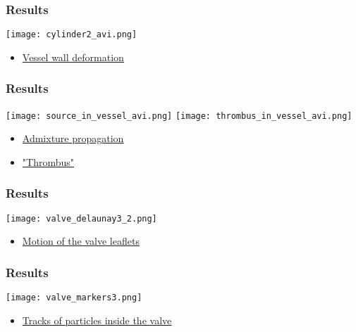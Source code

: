 \documentclass[14pt]{beamer}
\begin{document}
\begin{frame}
\frametitle{Results}
    \begin{center}
        \texttt{[image: cylinder2\_avi.png]}
    \end{center}

\begin{itemize}
    \item[\MVRightarrow] \href{run:video/cylinder2.avi}{Vessel wall deformation}
\end{itemize}
\end{frame}

\begin{frame}
\frametitle{Results}
    \begin{center}
        \texttt{[image: source\_in\_vessel\_avi.png]}
        \vspace{0.40mm}
        \texttt{[image: thrombus\_in\_vessel\_avi.png]}
    \end{center}

\begin{itemize}
    \item[\MVRightarrow] \href{run:video/source_in_vessel.avi}{Admixture propagation}
    \item[\MVRightarrow] \href{run:video/thrombus_in_vessel.avi}{"Thrombus"}
\end{itemize}
\end{frame}

\begin{frame}
\frametitle{Results}
    \begin{center}
        \texttt{[image: valve\_delaunay3\_2.png]}
    \end{center}

\begin{itemize}
    \item[\MVRightarrow] \href{run:video/valve_delaunay3.avi}{Motion of the valve leaflets}
\end{itemize}
\end{frame}

\begin{frame}
\frametitle{Results}
    \begin{center}
        \texttt{[image: valve\_markers3.png]}
    \end{center}

\begin{itemize}
    \item[\MVRightarrow] \href{run:video/valve_markers_better.avi}{Tracks of particles inside the valve}
\end{itemize}
\end{frame}
\end{document}

